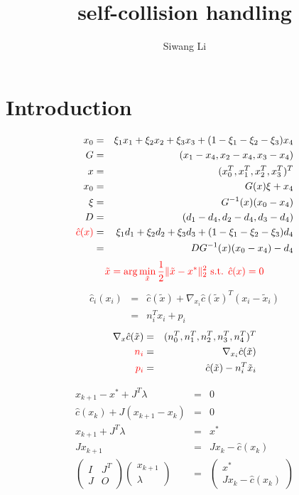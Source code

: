 \documentclass[9pt,twocolumn]{extarticle}
\author{Siwang Li}
\title{self-collision handling}
\newcommand{\TODO}[1]{\textcolor{red}{#1}}
\begin{document}
\maketitle

\setlength{\parskip}{0.5ex}

\section{Introduction}

\begin{eqnarray*}
   x_0 &=& \xi_1x_1+\xi_2x_2+\xi_3x_3+(1-\xi_1-\xi_2-\xi_3)x_4 \\
   G &=& (x_1-x_4, x_2-x_4, x_3-x_4)\\
   x &=& (x_0^T, x_1^T, x_2^T, x_3^T)^T\\
   x_0 &=& G(x)\xi+x_4 \\
   \xi &=& G^{-1}(x)(x_0-x_4) \\
   D &=& (d_1-d_4, d_2-d_4, d_3-d_4)\\
   \TODO{\hat{c}(x)} &=& \xi_1d_1+\xi_2d_2+\xi_3d_3+(1-\xi_1-\xi_2-\xi_3)d_4\\
   &=& DG^{-1}(x)(x_0-x_4)-d_4
\end{eqnarray*}
\begin{equation}
  \TODO{\tilde{x} = \arg \min_{\tilde{x}} \frac{1}{2}\|\tilde{x}-x^{*}\|_2^2 \text{ s.t. } \hat{c}(x) = 0}
\end{equation}
\begin{eqnarray*}
  \hat{c}_i(x_i) &=& \hat{c}(\tilde{x}) + \nabla_{x_i} \hat{c}(\tilde{x})^T(x_i-\tilde{x}_i)\\
  &=& n_i^Tx_i + p_i
\end{eqnarray*}
\begin{eqnarray*}
  \nabla_{x} \hat{c}(\tilde{x}) &=& (n_0^T, n_1^T, n_2^T, n_3^T, n_4^T)^T\\
  \TODO{n_i} &=& \nabla_{x_i} \hat{c}(\tilde{x})\\
  \TODO{p_i} &=& \hat{c}(\tilde{x}) - n_i^T\tilde{x}_i
\end{eqnarray*}

\begin{eqnarray*}
  x_{k+1}-x^* + J^T \lambda &=& 0\\
  \hat{c}(x_k)+J(x_{k+1}-x_k) &=& 0\\
  x_{k+1} + J^T \lambda &=& x^*\\
  J x_{k+1} &=& J x_k-\hat{c}(x_k)\\
  \left( \begin{array}{cc}
    I & J^T\\
    J & O
  \end{array} \right)
  \left( \begin{array}{c}
    x_{k+1}\\
    \lambda
  \end{array} \right) &=& 
\left( \begin{array}{c}
  x^*\\
J x_k-\hat{c}(x_k)  
\end{array} \right)
\end{eqnarray*}
\end{document}
